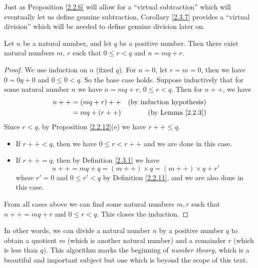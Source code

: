 \begin{remark}\label{2.3.8}
    Just as Proposition \ref{2.2.6} will allow for a ``virtual subtraction'' which will eventually let us define genuine subtraction, Corollary \ref{2.3.7} provides a ``virtual division'' which will be needed to define genuine division later on.
\end{remark}

\begin{proposition}\label{2.3.9}
    Let \(n\) be a natural number, and let \(q\) be a positive number.
    Then there exist natural numbers \(m\), \(r\) such that \(0 \leq r < q\) and \(n = mq + r\).
\end{proposition}

\begin{proof}
    We use induction on \(n\) (fixed \(q\)).
    For \(n = 0\), let \(r = m = 0\), then we have \(0 = 0q + 0\) and \(0 \leq 0 < q\).
    So the base case holds.
    Suppose inductively that for some natural number \(n\) we have \(n = mq + r\), \(0 \leq r < q\).
    Then for \(n++\), we have
    \begin{align*}
        n++ & = (mq + r)++ & \text{(by induction hypothesis)} \\
            & = mq + (r++) & \text{(by Lemma \ref{2.2.3})}    \\
    \end{align*}
    Since \(r < q\), by Proposition \ref{2.2.12}(e) we have \(r++ \leq q\).
    \begin{itemize}
        \item If \(r++ < q\), then we have \(0 \leq r < r++\) and we are done in this case.
        \item If \(r++ = q\), then by Definition \ref{2.3.1} we have
              \[
                  n++ = mq + q = (m++) \times q = (m++) \times q + r'
              \]
              where \(r' = 0\) and \(0 \leq r' < q\) by Definition \ref{2.2.11}, and we are also done in this case.
    \end{itemize}
    From all cases above we can find some natural numbers \(m, r\) such that \(n++ = mq + r\) and \(0 \leq r < q\).
    This closes the induction.
\end{proof}

\begin{remark}\label{2.3.10}
    In other words, we can divide a natural number \(n\) by a positive number \(q\) to obtain a quotient \(m\) (which is another natural number) and a remainder \(r\) (which is less than \(q\)).
    This algorithm marks the beginning of \emph{number theory}, which is a beautiful and important subject but one which is beyond the scope of this text.
\end{remark}

